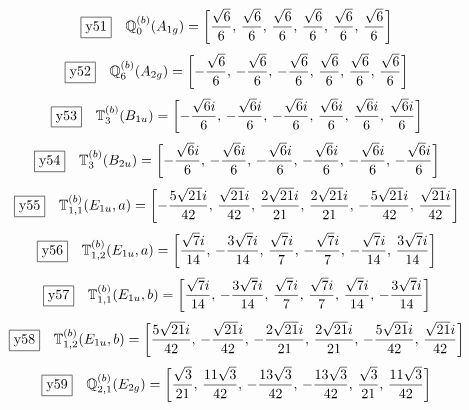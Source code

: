 \documentclass[fleqn,10pt,landscape]{jsarticle}
\begin{document}
\begin{dmath*}
\fbox{y51}\quad \mathbb{Q}_{0}^{(b)}(A_{1g})=\left[ \frac{\sqrt{6}}{6},\, \frac{\sqrt{6}}{6},\, \frac{\sqrt{6}}{6},\, \frac{\sqrt{6}}{6},\, \frac{\sqrt{6}}{6},\, \frac{\sqrt{6}}{6} \right]
\end{dmath*}
\begin{dmath*}
\fbox{y52}\quad \mathbb{Q}_{6}^{(b)}(A_{2g})=\left[ - \frac{\sqrt{6}}{6},\, - \frac{\sqrt{6}}{6},\, - \frac{\sqrt{6}}{6},\, \frac{\sqrt{6}}{6},\, \frac{\sqrt{6}}{6},\, \frac{\sqrt{6}}{6} \right]
\end{dmath*}
\begin{dmath*}
\fbox{y53}\quad \mathbb{T}_{3}^{(b)}(B_{1u})=\left[ - \frac{\sqrt{6} i}{6},\, - \frac{\sqrt{6} i}{6},\, - \frac{\sqrt{6} i}{6},\, \frac{\sqrt{6} i}{6},\, \frac{\sqrt{6} i}{6},\, \frac{\sqrt{6} i}{6} \right]
\end{dmath*}
\begin{dmath*}
\fbox{y54}\quad \mathbb{T}_{3}^{(b)}(B_{2u})=\left[ - \frac{\sqrt{6} i}{6},\, - \frac{\sqrt{6} i}{6},\, - \frac{\sqrt{6} i}{6},\, - \frac{\sqrt{6} i}{6},\, - \frac{\sqrt{6} i}{6},\, - \frac{\sqrt{6} i}{6} \right]
\end{dmath*}
\begin{dmath*}
\fbox{y55}\quad \mathbb{T}_{1,1}^{(b)}(E_{1u},a)=\left[ - \frac{5 \sqrt{21} i}{42},\, \frac{\sqrt{21} i}{42},\, \frac{2 \sqrt{21} i}{21},\, \frac{2 \sqrt{21} i}{21},\, - \frac{5 \sqrt{21} i}{42},\, \frac{\sqrt{21} i}{42} \right]
\end{dmath*}
\begin{dmath*}
\fbox{y56}\quad \mathbb{T}_{1,2}^{(b)}(E_{1u},a)=\left[ \frac{\sqrt{7} i}{14},\, - \frac{3 \sqrt{7} i}{14},\, \frac{\sqrt{7} i}{7},\, - \frac{\sqrt{7} i}{7},\, - \frac{\sqrt{7} i}{14},\, \frac{3 \sqrt{7} i}{14} \right]
\end{dmath*}
\begin{dmath*}
\fbox{y57}\quad \mathbb{T}_{1,1}^{(b)}(E_{1u},b)=\left[ \frac{\sqrt{7} i}{14},\, - \frac{3 \sqrt{7} i}{14},\, \frac{\sqrt{7} i}{7},\, \frac{\sqrt{7} i}{7},\, \frac{\sqrt{7} i}{14},\, - \frac{3 \sqrt{7} i}{14} \right]
\end{dmath*}
\begin{dmath*}
\fbox{y58}\quad \mathbb{T}_{1,2}^{(b)}(E_{1u},b)=\left[ \frac{5 \sqrt{21} i}{42},\, - \frac{\sqrt{21} i}{42},\, - \frac{2 \sqrt{21} i}{21},\, \frac{2 \sqrt{21} i}{21},\, - \frac{5 \sqrt{21} i}{42},\, \frac{\sqrt{21} i}{42} \right]
\end{dmath*}
\begin{dmath*}
\fbox{y59}\quad \mathbb{Q}_{2,1}^{(b)}(E_{2g})=\left[ \frac{\sqrt{3}}{21},\, \frac{11 \sqrt{3}}{42},\, - \frac{13 \sqrt{3}}{42},\, - \frac{13 \sqrt{3}}{42},\, \frac{\sqrt{3}}{21},\, \frac{11 \sqrt{3}}{42} \right]
\end{dmath*}
\end{document}
